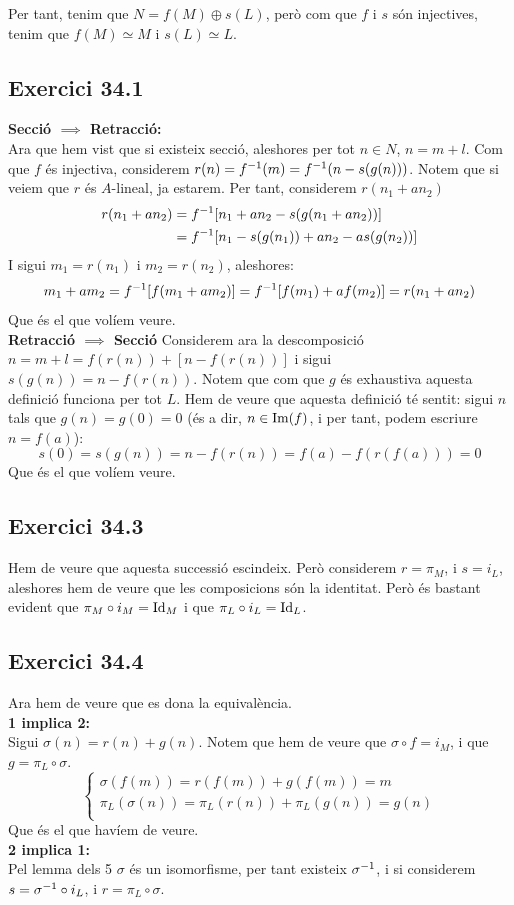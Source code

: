 \documentclass[11pt, a4paper]{article}
\begin{document}
Per tant, tenim que $N=f(M)\oplus s(L)$, però com que $f$ i $s$ són injectives, tenim que $f(M)\simeq M$ i $s(L)\simeq L$.
\subsection{Exercici 34.1}
\textbf{Secció $\implies$ Retracció:}\\
Ara que hem vist que si existeix secció, aleshores per tot $n\in N$, $n=m+l$. Com que $f$ és injectiva, considerem $r(n) = f^{-1}(m)=f^{-1}(n-s(g(n)))$. Notem que si veiem que $r$ és $A$-lineal, ja estarem. Per tant, considerem $r(n_1+an_2)$
\begin{align*}
    r(n_1+an_2)&=f^{-1}[n_1+an_2-s(g(n_1+an_2))]\\
    &=f^{-1}[n_1-s(g(n_1))+an_2-as(g(n_2))]
\end{align*}
I sigui $m_1= r(n_1)$ i $m_2=r(n_2)$, aleshores:
\[
    m_1+am_2=f^{-1}[f(m_1+am_2)]=f^{-1}[f(m_1)+af(m_2)]=r(n_1+an_2)
\]
Que és el que volíem veure.\\[4mm]
\textbf{Retracció $\implies$ Secció}
Considerem ara la descomposició $n = m + l= f(r(n))+ [n-f(r(n))]$ i sigui $s(g(n))=n-f(r(n))$. Notem que com que $g$ és exhaustiva aquesta definició funciona per tot $L$. Hem de veure que aquesta definició té sentit: sigui $n$ tals que $g(n)=g(0)=0$ (és a dir, $n\in \operatorname{Im} (f)$, i per tant, podem escriure $n=f(a)$):
\[
    s(0)=s(g(n))=n-f(r(n))=f(a)-f(r(f(a)))=0
\]
Que és el que volíem veure.
\subsection{Exercici 34.3}
Hem de veure que aquesta successió escindeix. Però considerem $r=\pi_{M}$, i $s=i_L$, aleshores hem de veure que les composicions són la identitat. Però és bastant evident que $\pi_M \circ i_M=\mathrm{Id}_M$ i que $\pi_L \circ i_L=\mathrm{Id}_L$.
\subsection{Exercici 34.4}
Ara hem de veure que es dona la equivalència.\\[2mm]
\textbf{1 implica 2:}\\
Sigui $\sigma(n)=r(n)+g(n)$. Notem que hem de veure que $\sigma\circ f = i_M$, i que $g = \pi_L \circ \sigma$.
\[
\begin{cases*}
    \sigma(f(m))=r(f(m))+g(f(m))=m\\
    \pi_L(\sigma(n))=\pi_L(r(n))+\pi_L(g(n))=g(n)\\
\end{cases*}    
\]
Que és el que havíem de veure.\\[2mm]
\textbf{2 implica 1:}\\
Pel lemma dels 5 $\sigma$ és un isomorfisme, per tant existeix $\sigma ^{-1}$, i si considerem $s = \sigma ^{-1} \circ i_L$, i $r = \pi_L\circ \sigma$.
\end{document}
